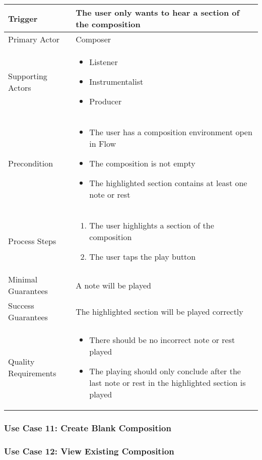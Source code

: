 \begin{tabularx}{\textwidth}{|X|X|}
\hline
Trigger & 
The user only wants to hear a section of the composition \\
\hline
Primary Actor & 
Composer \\
\hline
Supporting Actors & 
\begin{itemize}
\item Listener
\item Instrumentalist
\item Producer
\end{itemize} \\
\hline
Precondition & 
\begin{itemize}
\item The user has a composition environment open in Flow
\item The composition is not empty
\item The highlighted section contains at least one note or rest
\end{itemize} \\
\hline
Process Steps & 
\begin{enumerate}
\item The user highlights a section of the composition
\item The user taps the play button
\end{enumerate} \\
\hline
Minimal Guarantees & 
A note will be played \\
\hline
Success Guarantees & 
The highlighted section will be played correctly \\
\hline
Quality Requirements & 
\begin{itemize}
\item There should be no incorrect note or rest played
\item The playing should only conclude after the last note or rest in the highlighted section is played
\end{itemize} \\ 
\hline
\end{tabularx}

\subsubsection{Use Case 11: Create Blank Composition}


\subsubsection{Use Case 12: View Existing Composition}

